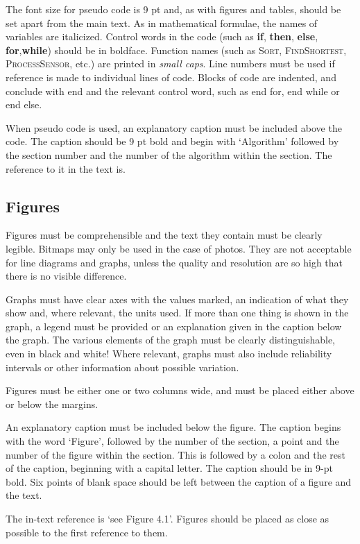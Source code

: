 The font size for pseudo code is 9 pt and, as with figures and tables, should be set apart from the main text.
As in mathematical formulae, the names of  variables are italicized.
Control words in the code (such as \textbf{if}, \textbf{then}, \textbf{else}, \textbf{for},\textbf{while}) should be in boldface.
Function names (such as \textsc{Sort}, \textsc{FindShortest}, \textsc{ProcessSensor}, etc.) are printed in \emph{small caps}.
Line numbers must be used if reference is made to individual lines of code.
Blocks of code are indented, and conclude with end and the relevant control word, such as end for, end while or end else.

When pseudo code is used, an explanatory caption must be included above the code.
The caption should be 9 pt bold and begin with `Algorithm' followed by the section number and the number of the algorithm within the section.
The reference to it in the text is.


\subsection{Figures}\label{sec:_figures}
Figures must be comprehensible and the text they contain must be clearly legible.
Bitmaps may only be used in the case of photos.
They are not acceptable for line diagrams and graphs, unless the quality and resolution are so high that there is no visible difference.

Graphs must have clear axes with the values marked, an indication of what they show and, where relevant, the units used.
If more than one thing is shown in the graph, a legend must be provided or an explanation given in the caption below the graph.
The various elements of the graph must be clearly distinguishable, even in black and white! Where relevant, graphs must also include reliability intervals or other information about possible variation.

Figures must be either one or two columns wide, and must be placed either above or below the margins.

An explanatory caption must be included below the figure.
The caption begins with the word ‘Figure’, followed by the number of the section, a point and the number of the figure within the section.
This is followed by a colon and the rest of the caption, beginning with a capital letter.
The caption should be in 9-pt bold.
Six points of blank space should be left between the caption of a figure and the text.

The in-text reference is ‘see Figure 4.1’.
Figures should be placed as close as possible to the first reference to them.

